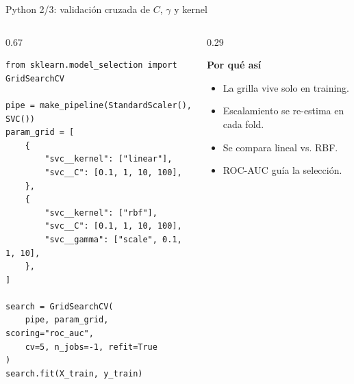 \begin{frame}[fragile]{Python 2/3: validación cruzada de $C$, $\gamma$ y kernel}
\scriptsize
\begin{columns}[T,onlytextwidth]
\begin{column}{0.67\textwidth}
\begin{lstlisting}[style=ccdepython]
from sklearn.model_selection import GridSearchCV

pipe = make_pipeline(StandardScaler(), SVC())
param_grid = [
    {
        "svc__kernel": ["linear"],
        "svc__C": [0.1, 1, 10, 100],
    },
    {
        "svc__kernel": ["rbf"],
        "svc__C": [0.1, 1, 10, 100],
        "svc__gamma": ["scale", 0.1, 1, 10],
    },
]

search = GridSearchCV(
    pipe, param_grid, scoring="roc_auc",
    cv=5, n_jobs=-1, refit=True
)
search.fit(X_train, y_train)
\end{lstlisting}
\end{column}
\begin{column}{0.29\textwidth}
\begin{keybox}
\textbf{Por qué así}
\begin{itemize}
  \item La grilla vive solo en training.
  \item Escalamiento se re-estima en cada fold.
  \item Se compara lineal vs. RBF.
  \item ROC-AUC guía la selección.
\end{itemize}
\end{keybox}
\end{column}
\end{columns}
\end{frame}

